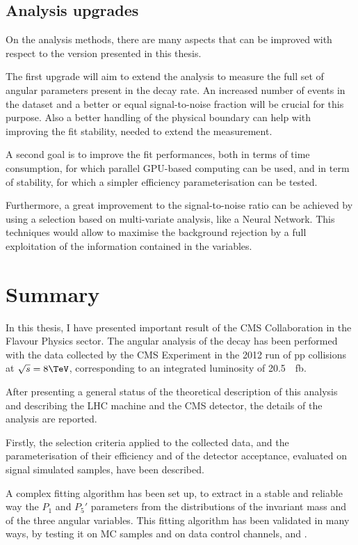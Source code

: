 \subsection{Analysis upgrades}
\label{sec:AnalUpg}

On the analysis methods, there are many aspects that can be improved with respect to the version presented in this thesis.

The first upgrade will aim to extend the analysis to measure the full set of angular parameters present in the decay rate.
An increased number of events in the dataset and a better or equal signal-to-noise fraction will be crucial for this purpose.
Also a better handling of the physical boundary can help with improving the fit stability, needed to extend the measurement.

A second goal is to improve the fit performances, both in terms of time consumption, for which parallel GPU-based computing can be used, and in term of stability, for which a simpler efficiency parameterisation can be tested.

Furthermore, a great improvement to the signal-to-noise ratio can be achieved by using a selection based on multi-variate analysis, like a Neural Network. This techniques would allow to maximise the background rejection by a full exploitation of the information contained in the variables.


\section{Summary}
\label{sec:Summ}

In this thesis, I have presented important result of the CMS Collaboration in the Flavour Physics sector.
The angular analysis of the \BtoKstmumu decay has been performed with the data collected by the CMS Experiment in the 2012 run of pp collisions at $\sqrt{s}=8\TeV$, corresponding to an integrated luminosity of \SI{20.5}{\per\femto\barn}.

After presenting a general status of the theoretical description of this analysis and describing the LHC machine and the CMS detector, the details of the analysis are reported.

Firstly, the selection criteria applied to the collected data, and the parameterisation of their efficiency and of the detector acceptance, evaluated on signal simulated samples, have been described.

A complex fitting algorithm has been set up, to extract in a stable and reliable way the $P_1$ and $P_5'$ parameters from the distributions of the \PKp\Pgpm\Pgmp\Pgmm invariant mass and of the three angular variables.
This fitting algorithm has been validated in many ways, by testing it on MC samples and on data control channels, \BtoKstJpsimumu and \BtoKstpsipmumu.

